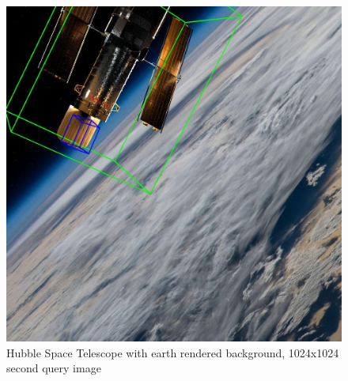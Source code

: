\begin{figure}[h]
\begin{minipage}{0.45\linewidth}
        \includegraphics[width=\linewidth]{data/fig1.jpg} %
        \caption{Hubble Space Telescope with earth rendered background, 1024x1024 second query image}
        \label{fig:image2}
    \end{minipage}
\end{figure}


